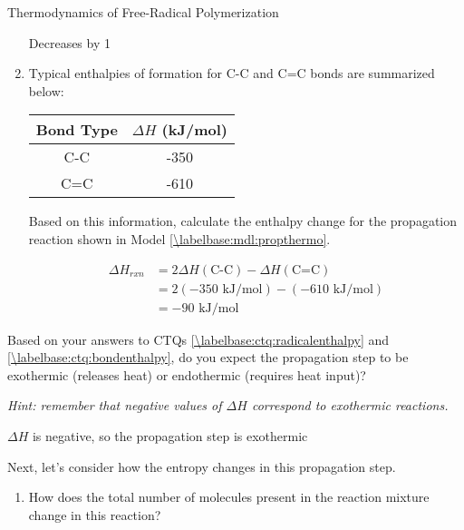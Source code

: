 \begin{activity}{Thermodynamics of Free-Radical Polymerization}
\begin{ctqs}
\begin{enumerate}
				\begin{solution}[0.75in]{}
					Decreases by 1
				\end{solution}
			
			\item Typical enthalpies of formation for C-C and C=C bonds are summarized below:
				
				\begin{center}
					\renewcommand{\arraystretch}{1.5}
					\begin{tabular}{c c}
						\hline
						Bond Type & $\Delta H$ (kJ/mol) \\\hline
						C-C	&	-350 \\
						C=C &	-610 \\\hline
					\end{tabular}
				\end{center}
				
				Based on this information, calculate the enthalpy change for the propagation reaction shown in Model \ref{\labelbase:mdl:propthermo}.
				
				\begin{solution}[1.25in]{}
					\begin{align*}
						\Delta H_{rxn} &= 2\Delta H(\text{C-C}) - \Delta H (\text{C=C})\\
							&= 2(-350\text{ kJ/mol}) - (-610\text{ kJ/mol})\\
							&= -90\text{ kJ/mol}
					\end{align*}
				\end{solution}
		\end{enumerate}
		
	\question Based on your answers to CTQs \ref{\labelbase:ctq:radicalenthalpy} and \ref{\labelbase:ctq:bondenthalpy}, do you expect the propagation step to be exothermic (releases heat) or endothermic (requires heat input)?
	
		\emph{Hint: remember that negative values of $\Delta H$ correspond to exothermic reactions.}
				
				\begin{solution}[0.75in]{}
					$\Delta H$ is negative, so the propagation step is exothermic
				\end{solution}
		
	\question Next, let's consider how the entropy changes in this propagation step.
	
		\begin{enumerate}
			
			\item How does the total number of molecules present in the reaction mixture change in this reaction?
				

\end{enumerate}
\end{ctqs}
\end{activity}
